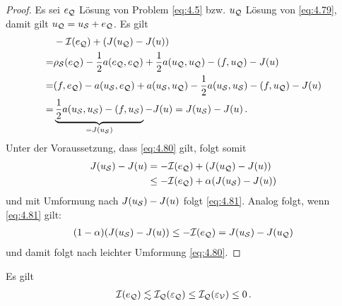\begin{proof}
Es sei $e_{\mathcal Q}$ Lösung von Problem \eqref{eq:4.5} bzw. $u_{\mathcal Q}$ Lösung von \eqref{eq:4.79}, damit gilt $u_{\mathcal Q} = u_{\mathcal S} + e_{\mathcal Q}$. Es gilt
\begin{align*}
	& -\mathcal I(e_{\mathcal Q}) + (J(u_{\mathcal Q})-J(u))  \\
	 = & \rho_{\mathcal S}(e_{\mathcal Q})-\frac 12 a(e_{\mathcal Q},e_{\mathcal Q}) + \frac 12 a(u_{\mathcal Q},u_{\mathcal Q})-(f,u_{\mathcal Q})-J(u) \\
	 = & (f,e_{\mathcal Q})-a(u_{\mathcal S},e_{\mathcal Q})+a(u_{\mathcal S},u_{\mathcal Q})-\frac 12 a(u_{\mathcal S},u_{\mathcal S})-(f,u_{\mathcal Q})- J(u) \\
	 = & \underbrace{\frac 1 2 a(u_{\mathcal S},u_{\mathcal S}) - (f,u_{\mathcal S})}_{=J(u_{\mathcal S})} - J(u) = J(u_{\mathcal S})-J(u) \, .
\end{align*}
Unter der Voraussetzung, dass \eqref{eq:4.80} gilt, folgt somit
\begin{align*}
	J(u_{\mathcal S})-J(u) &= -\mathcal I (e_{\mathcal Q}) + (J(u_{\mathcal Q})-J(u)) \\
	& \le -\mathcal I(e_{\mathcal Q}) + \alpha (J(u_{\mathcal S})-J(u))
\end{align*}
und mit Umformung nach $J(u_{\mathcal S})-J(u)$ folgt \eqref{eq:4.81}. Analog folgt, wenn \eqref{eq:4.81} gilt:
\begin{align*}
	(1-\alpha)(J(u_{\mathcal S}) - J(u)) \le -\mathcal I (e_{\mathcal Q}) = J(u_{\mathcal S})-J(u_{\mathcal Q}) 
\end{align*}
und damit folgt nach leichter Umformung \eqref{eq:4.80}.
\end{proof}


\begin{lemma}\label{lem:4.27}
Es gilt
\begin{align}\label{eq:4.82}
	\mathcal I(e_{\mathcal Q}) \lesssim \mathcal I_{\mathcal Q} (\varepsilon_{\mathcal Q}) \le \mathcal I_{\mathcal Q} (\varepsilon_{\mathcal V}) \le 0 \, .
\end{align}
\end{lemma}

